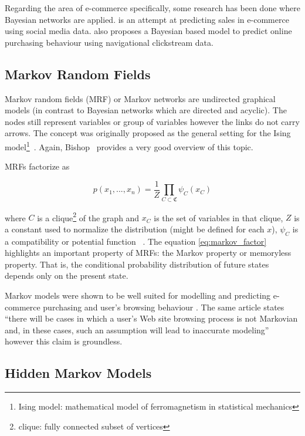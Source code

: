 Regarding the area of e-commerce specifically, some research has been done 
where Bayesian networks are applied. \cite{Nasambu2014} is an attempt at 
predicting sales in e-commerce using social media data. \cite{Moe2002} also 
proposes a Bayesian based model to predict online purchasing behaviour using 
navigational clickstream data.

\subsection{Markov Random Fields}

Markov random fields (MRF) or Markov networks are undirected graphical models 
\cite{Kindermann1980} (in contrast to Bayesian networks which are directed and 
acyclic). The nodes still represent variables or group of variables however the 
links do not carry arrows. The concept was originally proposed as the general 
setting for the Ising model\footnote{Ising model: mathematical model of 
    ferromagnetism in statistical mechanics}~\cite{Kindermann1980}. Again, 
Bishop~\cite{bishop2006pattern} provides a very good overview of this topic. 

MRFs factorize as

\begin{equation}
p(x_{1}, ..., x_{n}) = \frac{1}{Z} \prod_{C \subset \mathfrak{C}}^{} 
\psi_{C}(x_{C}) \label{eq:markov_factor}
\end{equation}

where $ C $ is a clique\footnote{clique: fully connected subset of vertices} of 
the graph and $ x_{C} $ is the set of variables in that clique, $ Z $ is a 
constant used to normalize the distribution (might be defined for each $ x $), 
$ \psi_{C} $ is a compatibility or potential function~\cite[section 
2.1.2]{Wainwright2008} \cite[section 8.3]{bishop2006pattern}. The equation 
\ref{eq:markov_factor} highlights an important property of MRFs: the Markov 
property or memoryless property. That is, the conditional probability 
distribution of future states depends only on the present state. 

Markov models were shown to be well suited for modelling and predicting 
e-commerce purchasing and user's browsing behaviour \cite{Deshpande2001}. The 
same article states ``there will be cases in which a user’s Web site
browsing process is not Markovian and, in these cases, such an assumption will
lead to inaccurate modeling'' however this claim is groundless.

\subsection{Hidden Markov Models}

